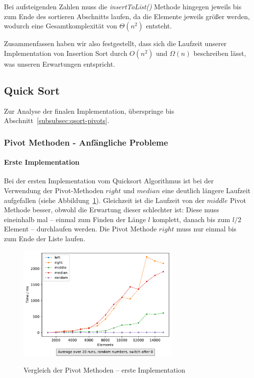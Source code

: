 Bei aufsteigenden Zahlen muss die \textit{insertToList()} Methode hingegen
jeweils bis zum Ende des sortieren Abschnitts laufen, da die Elemente jeweils
größer werden, wodurch eine Gesamtkomplexität von \(\Theta (n^2)\) entsteht.

Zusammenfassen haben wir also festgestellt, dass sich die Laufzeit unserer
Implementation von Insertion Sort durch \(O(n^2)\) und \(\Omega(n)\)
beschreiben lässt, was unseren Erwartungen entspricht.

\subsection{Quick Sort}\label{subsec:quick-sort-laufzeit}
Zur Analyse der finalen Implementation, überspringe bis
Abschnitt~\ref{subsubsec:qsort-pivots}.

\subsubsection{Pivot Methoden - Anfängliche Probleme}

\paragraph{Erste Implementation}
Bei der ersten Implementation vom Quicksort Algorithmus ist bei der
Verwendung der Pivot-Methoden \(right\) und \(median\)  eine deutlich längere
Laufzeit aufgefallen (siehe Abbildung~\ref{fig:qsort-first-impl}).
Gleichzeit ist die Laufzeit von der \(middle\) Pivot Methode besser, obwohl
die Erwartung dieser schlechter ist:
Diese muss eineinhalb mal -- einmal zum Finden der Länge \(l\) komplett, danach
bis zum \(l/2\) Element -- durchlaufen werden.
Die Pivot Methode \(right\) muss nur einmal bis zum Ende der Liste laufen.

\begin{figure}[hbt]
    \caption{Vergleich der Pivot Methoden -- erste Implementation}
    \centering
    \includegraphics[width = 8cm]
    {../out/pivotMethods_Implementation1.pdf}\label{fig:qsort-first-impl}
\end{figure}

